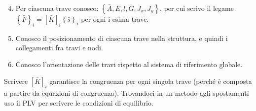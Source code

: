\begin{enumerate}
 \setcounter{enumi}{3}
    \item Per ciascuna trave conosco: $\left\{\bar{A}, E, l ,G, J_x, J_y\right\}$, per cui scrivo il legame 
    $\left\{\bar{F}\right\}_i = [\bar{K}]_i\left\{\bar{s}\right\}_i$ per ogni i-esima trave.\\
    \item Conosco il posizionamento di ciascuna trave nella struttura, e quindi i collegamenti fra travi e nodi.\\
    \item Conosco l'orientazione delle travi rispetto al sistema di riferimento globale.\\
\end{enumerate}

Scrivere $[\bar{K}]_i$ garantisce la congruenza per ogni singola trave (perché è composta a partire da equazioni di congruenza). Trovandoci in un metodo agli spostamenti uso il PLV per scrivere le condizioni di equilibrio.

